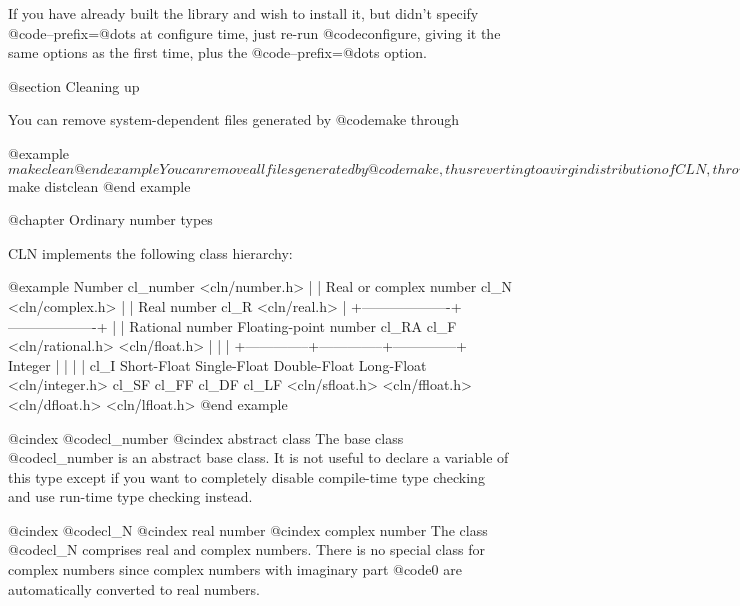 If you have already built the library and wish to install it, but didn't
specify @code{--prefix=@dots{}} at configure time, just re-run
@code{configure}, giving it the same options as the first time, plus
the @code{--prefix=@dots{}} option.


@section Cleaning up

You can remove system-dependent files generated by @code{make} through

@example
$ make clean
@end example

You can remove all files generated by @code{make}, thus reverting to a
virgin distribution of CLN, through

@example
$ make distclean
@end example


@chapter Ordinary number types

CLN implements the following class hierarchy:

@example
                        Number
                      cl_number
                    <cln/number.h>
                          |
                          |
                 Real or complex number
                        cl_N
                    <cln/complex.h>
                          |
                          |
                     Real number
                        cl_R
                     <cln/real.h>
                          |
      +-------------------+-------------------+
      |                                       |
Rational number                     Floating-point number
    cl_RA                                   cl_F
<cln/rational.h>                         <cln/float.h>
      |                                       |
      |                +--------------+--------------+--------------+
   Integer             |              |              |              |
    cl_I          Short-Float    Single-Float   Double-Float    Long-Float
<cln/integer.h>      cl_SF          cl_FF          cl_DF          cl_LF
                 <cln/sfloat.h> <cln/ffloat.h> <cln/dfloat.h> <cln/lfloat.h>
@end example

@cindex @code{cl_number}
@cindex abstract class
The base class @code{cl_number} is an abstract base class.
It is not useful to declare a variable of this type except if you want
to completely disable compile-time type checking and use run-time type
checking instead.

@cindex @code{cl_N}
@cindex real number
@cindex complex number
The class @code{cl_N} comprises real and complex numbers. There is
no special class for complex numbers since complex numbers with imaginary
part @code{0} are automatically converted to real numbers.

